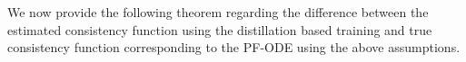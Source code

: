 \documentclass[11pt]{article}
\def\rvx{{\mathbf{x}}}
\def\vs{{\bm{s}}}
\def\vx{{\bm{x}}}
\def\vy{{\bm{y}}}
\newtheorem{lemma}{Lemma}[section]
\begin{document}
\noindent
We now provide the following theorem regarding the difference between the estimated consistency function using the distillation based training and true consistency function corresponding to the PF-ODE using the above assumptions.
\end{document}
